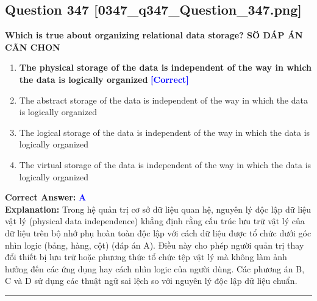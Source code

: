 \documentclass[11pt,a4paper]{article}
\begin{document}
\begin{minipage}{\textwidth}
\subsection*{Question 347 \quad \footnotesize{[0347\_q347\_Question\_347.png]}}
\noindent \textbf{Which is true about organizing relational data storage? SÖ DÁP ÁN CÃN CHON}

\begin{enumerate}[label=\Alph*.]
    \item \textbf{The physical storage of the data is independent of the way in which the data is logically organized} \hfill \textcolor{blue}{\textbf{[Correct]}}
    \item The abstract storage of the data is independent of the way in which the data is logically organized
    \item The logical storage of the data is independent of the way in which the data is logically organized
    \item The virtual storage of the data is independent of the way in which the data is logically organized
\end{enumerate}

\noindent \textbf{Correct Answer:} \textcolor{blue}{\textbf{A}} \\[2pt]
\noindent \textbf{Explanation:} Trong hệ quản trị cơ sở dữ liệu quan hệ, nguyên lý độc lập dữ liệu vật lý (physical data independence) khẳng định rằng cấu trúc lưu trữ vật lý của dữ liệu trên bộ nhớ phụ hoàn toàn độc lập với cách dữ liệu được tổ chức dưới góc nhìn logic (bảng, hàng, cột) (đáp án A). Điều này cho phép người quản trị thay đổi thiết bị lưu trữ hoặc phương thức tổ chức tệp vật lý mà không làm ảnh hưởng đến các ứng dụng hay cách nhìn logic của người dùng. Các phương án B, C và D sử dụng các thuật ngữ sai lệch so với nguyên lý độc lập dữ liệu chuẩn.

\par\vspace{0.3cm}
\hrule
\vspace{0.3cm}
\end{minipage}
\end{document}
